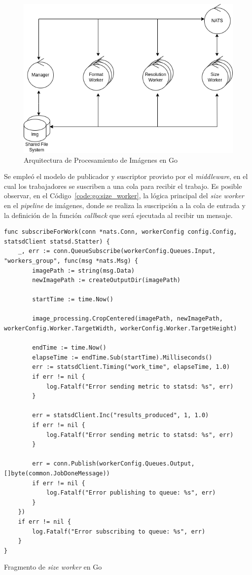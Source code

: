 \documentclass[11pt]{article}
\newcommand{\english}[1]{\textit{#1}}
\begin{document}
\begin{figure}[ht]
    \centering
    \includegraphics[scale=0.4]{resources/distributed_systems/go/image_processing_arch.png}
    \caption{Arquitectura de Procesamiento de Imágenes en Go}
    \label{fig:go:image_processing_arch}
\end{figure}

Se empleó el modelo de publicador y suscriptor provisto por el \english{middleware}, en el cual los trabajadores se suscriben a una cola para recibir el trabajo. Es posible observar, en el Código~\ref{code:go:size_worker}, la lógica principal del \english{size worker} en el \english{pipeline} de imágenes, donde se realiza la suscripción a la cola de entrada y la definición de la función \english{callback} que será ejecutada al recibir un mensaje.

\begin{listing}[ht]
\begin{verbatim}
func subscribeForWork(conn *nats.Conn, workerConfig config.Config, statsdClient statsd.Statter) {
	_, err := conn.QueueSubscribe(workerConfig.Queues.Input, "workers_group", func(msg *nats.Msg) {
		imagePath := string(msg.Data)
		newImagePath := createOutputDir(imagePath)

		startTime := time.Now()

		image_processing.CropCentered(imagePath, newImagePath, workerConfig.Worker.TargetWidth, workerConfig.Worker.TargetHeight)

		endTime := time.Now()
		elapseTime := endTime.Sub(startTime).Milliseconds()
		err := statsdClient.Timing("work_time", elapseTime, 1.0)
		if err != nil {
			log.Fatalf("Error sending metric to statsd: %s", err)
		}

		err = statsdClient.Inc("results_produced", 1, 1.0)
		if err != nil {
			log.Fatalf("Error sending metric to statsd: %s", err)
		}

		err = conn.Publish(workerConfig.Queues.Output, []byte(common.JobDoneMessage))
		if err != nil {
			log.Fatalf("Error publishing to queue: %s", err)
		}
	})
	if err != nil {
		log.Fatalf("Error subscribing to queue: %s", err)
	}
}
\end{verbatim}
\caption{Fragmento de \english{size worker} en Go}
\label{code:go:size_worker}
\end{listing}
\end{document}
